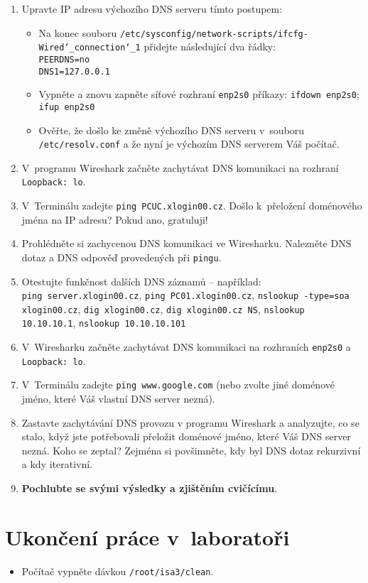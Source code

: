 \begin{enumerate}
  \item Upravte IP adresu výchozího DNS serveru tímto postupem:
  \begin{itemize}
    \item Na konec souboru {\tt /etc/sysconfig/network-scripts/ifcfg-Wired\char`_connection\char`_1} přidejte následující dva řádky:\\
          \verb|PEERDNS=no|\\
          \verb|DNS1=127.0.0.1|
    \item Vypněte a znovu zapněte síťové rozhraní {\tt enp2s0} příkazy: {\tt ifdown enp2s0}; {\tt ifup enp2s0}
    \item Ověřte, že došlo ke změně výchozího DNS serveru v~souboru {\tt /etc/resolv.conf} a že nyní je výchozím DNS serverem Váš počítač.
  \end{itemize}
  \item V~programu Wireshark začněte zachytávat DNS komunikaci na rozhraní {\tt Loopback: lo}.
  \item V~Terminálu zadejte {\tt ping PCUC.xlogin00.cz}. Došlo k~přeložení doménového jména na IP adresu? Pokud ano, gratuluji!
  \item Prohlédněte si zachycenou DNS komunikaci ve Wiresharku. Nalezněte DNS dotaz a DNS odpověď provedených při {\tt pingu}.
  \item Otestujte funkčnost dalších DNS záznamů -- například:\\
        {\tt ping server.xlogin00.cz}, {\tt ping PC01.xlogin00.cz}, {\tt nslookup -type=soa xlogin00.cz}, {\tt dig xlogin00.cz}, {\tt dig xlogin00.cz NS}, {\tt nslookup 10.10.10.1}, {\tt nslookup 10.10.10.101}
  \item V~Wiresharku začněte zachytávat DNS komunikaci na rozhraních {\tt enp2s0} a {\tt Loopback: lo}.
  \item V~Terminálu zadejte {\tt ping www.google.com} (nebo zvolte jiné doménové jméno, které Váš vlastní DNS server nezná).
  \item Zastavte zachytávání DNS provozu v programu Wireshark a analyzujte, co se stalo, když jste potřebovali přeložit doménové jméno, které Váš DNS server nezná. Koho se zeptal? Zejména si povšimněte, kdy byl DNS dotaz rekurzivní a kdy iterativní.
  \item {\bf Pochlubte se svými výsledky a zjištěním cvičícímu}.
\end{enumerate}




\section{Ukončení práce v~laboratoři}
\begin{itemize}
  \item Počítač vypněte dávkou {\tt /root/isa3/clean}.
\end{itemize}
